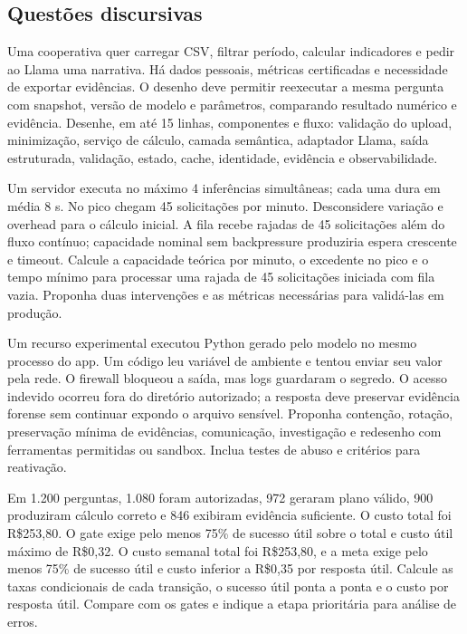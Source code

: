 \subsection{Questões discursivas}

\TextoBase
Uma cooperativa quer carregar CSV, filtrar período, calcular indicadores e pedir ao Llama uma narrativa. Há dados pessoais, métricas certificadas e necessidade de exportar evidências.
O desenho deve permitir reexecutar a mesma pergunta com snapshot, versão de modelo e parâmetros, comparando resultado numérico e evidência.
\FonteDidatica
\Comando Desenhe, em até 15 linhas, componentes e fluxo: validação do upload, minimização, serviço de cálculo, camada semântica, adaptador Llama, saída estruturada, validação, estado, cache, identidade, evidência e observabilidade.

\TextoBase
Um servidor executa no máximo 4 inferências simultâneas; cada uma dura em média 8 s. No pico chegam 45 solicitações por minuto. Desconsidere variação e overhead para o cálculo inicial.
A fila recebe rajadas de 45 solicitações além do fluxo contínuo; capacidade nominal sem backpressure produziria espera crescente e timeout.
\FonteDidatica
\Comando Calcule a capacidade teórica por minuto, o excedente no pico e o tempo mínimo para processar uma rajada de 45 solicitações iniciada com fila vazia. Proponha duas intervenções e as métricas necessárias para validá-las em produção.

\TextoBase
Um recurso experimental executou Python gerado pelo modelo no mesmo processo do app. Um código leu variável de ambiente e tentou enviar seu valor pela rede. O firewall bloqueou a saída, mas logs guardaram o segredo.
O acesso indevido ocorreu fora do diretório autorizado; a resposta deve preservar evidência forense sem continuar expondo o arquivo sensível.
\FonteDidatica
\Comando Proponha contenção, rotação, preservação mínima de evidências, comunicação, investigação e redesenho com ferramentas permitidas ou sandbox. Inclua testes de abuso e critérios para reativação.

\TextoBase
Em 1.200 perguntas, 1.080 foram autorizadas, 972 geraram plano válido, 900 produziram cálculo correto e 846 exibiram evidência suficiente. O custo total foi R\$253,80. O gate exige pelo menos 75\% de sucesso útil sobre o total e custo útil máximo de R\$0,32.
O custo semanal total foi R\$253,80, e a meta exige pelo menos 75\% de sucesso útil e custo inferior a R\$0,35 por resposta útil.
\FonteDidatica
\Comando Calcule as taxas condicionais de cada transição, o sucesso útil ponta a ponta e o custo por resposta útil. Compare com os gates e indique a etapa prioritária para análise de erros.

